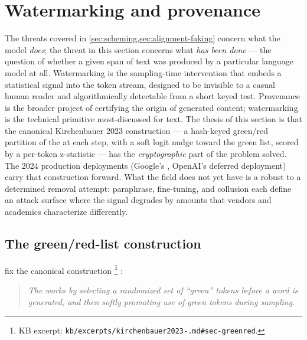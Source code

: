 
\section{Watermarking and provenance}
\label{sec:watermarking}

The threats covered in \cref{sec:scheming,sec:alignment-faking} concern
what the model \emph{does}; the threat in this section concerns what
\emph{has been done} --- the question of whether a given span of text
was produced by a particular language model at all. Watermarking is the
sampling-time intervention that embeds a statistical signal into the
token stream, designed to be invisible to a casual human reader and
algorithmically detectable from a short keyed test. Provenance is the
broader project of certifying the origin of generated content;
watermarking is the technical primitive most-discussed for text. The
thesis of this section is that the canonical Kirchenbauer 2023
construction --- a hash-keyed green/red partition of the  at
each step, with a soft logit nudge toward the green list, scored by a
per-token z-statistic --- has the \emph{cryptographic} part of the
problem solved. The 2024 production deployments (Google's
, OpenAI's deferred deployment) carry that construction
forward. What the field does not yet have is a  robust to a
determined removal attempt: paraphrase, fine-tuning, and collusion
each define an attack surface where the signal degrades by amounts
that vendors and academics characterize differently.

\subsection{The green/red-list construction}
\label{sec:watermarking-construction}

\citet{kirchenbauer2023-watermark} fix the canonical construction%
\footnote{KB excerpt: \texttt{kb/excerpts/kirchenbauer2023-.md\#sec-greenred}.}
\citep[\S{}abstract]{kirchenbauer2023-watermark}:

\begin{quote}\itshape
The  works by selecting a randomized set of ``green'' tokens
before a word is generated, and then softly promoting use of green
tokens during sampling.
\end{quote}

